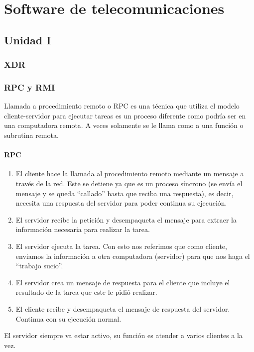 \documentclass[
	12pt, %
	fleqn, %
	a4paper, %
	oneside, %
]{LegrandOrangeBook}
\begin{document}
\part{Software de telecomunicaciones}

\chapter{Unidad I}
\section{XDR}
\section{RPC y RMI}
Llamada a procedimiento remoto o RPC es una técnica que utiliza  el modelo cliente-servidor para ejecutar  tareas es un proceso diferente como podría ser en una computadora remota. A veces solamente se le llama como a una función o subrutina remota.
\subsection*{RPC}
\begin{enumerate}
\item El cliente hace la llamada al procedimiento remoto mediante un mensaje a través de la red. Este se detiene ya que es un proceso síncrono (se envía el mensaje y se queda ``callado'' hasta que reciba una respuesta), es decir, necesita una respuesta del servidor para poder continua su ejecución.
\item El servidor recibe la petición y desempaqueta el mensaje para extraer la información necesaria para realizar la tarea.
\item El servidor ejecuta la tarea. Con esto nos referimos que como cliente, enviamos la información a otra computadora (servidor) para que nos haga el ``trabajo sucio''.
\item El servidor crea un mensaje de respuesta para el cliente que incluye el resultado de la tarea que este le pidió realizar.
\item El cliente recibe y desempaqueta el mensaje de respuesta del servidor. Continua con su ejecución normal.
\end{enumerate}
\begin{notation}
El servidor siempre va estar activo, su función es atender a varios clientes a la vez.
\end{notation}
\end{document}
